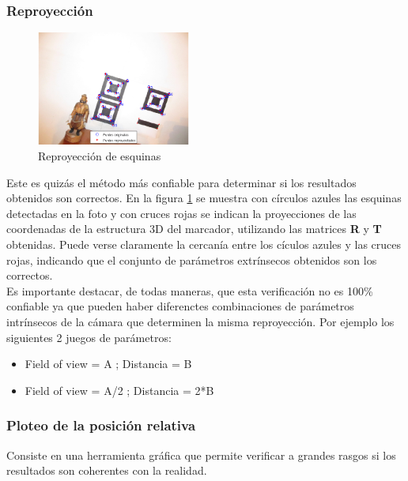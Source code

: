 \documentclass[main]{subfiles}
\begin{document}
\subsubsection*{Reproyección}

\begin{figure}
	\begin{center}
	\vspace{-20pt}
		\includegraphics[width=0.45\textwidth]{./pics_camara/resultado_rp.png}
	\end{center}
	\caption{Reproyección de esquinas}
	\label{fig:resultado_rp}
\end{figure}

Este es quizás el método más confiable para determinar si los resultados obtenidos son correctos. En la figura \ref{fig:resultado_rp} se muestra con círculos azules las esquinas detectadas en la foto y con cruces rojas se indican la proyecciones de las coordenadas de la estructura 3D del marcador, utilizando las matrices \textbf{R} y \textbf{T} obtenidas. Puede verse claramente la cercanía entre los cículos azules y las cruces rojas, indicando que el conjunto de parámetros extrínsecos obtenidos son los correctos.\\

Es importante destacar, de todas maneras, que esta verificación no es 100\% confiable ya que pueden haber diferenctes combinaciones de parámetros intrínsecos de la cámara que determinen la misma reproyección. Por ejemplo los siguientes 2 juegos de parámetros:
\begin{itemize}
\item Field of view = A   ; Distancia = B
\item Field of view = A/2 ; Distancia = 2*B
\end{itemize}

\subsubsection*{Ploteo de la posición relativa}

Consiste en una herramienta gráfica que permite verificar a grandes rasgos si los resultados son coherentes con la realidad.\\
 
\end{document}

